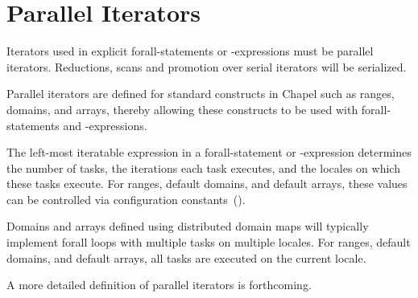 \section{Parallel Iterators}
\label{Parallel_Iterators}

Iterators used in explicit forall-statements or -expressions must be
parallel iterators.  Reductions, scans and promotion over serial
iterators will be serialized.

Parallel iterators are defined for standard constructs in Chapel such
as ranges, domains, and arrays, thereby allowing these constructs to
be used with forall-statements and -expressions.

The left-most iteratable expression in a forall-statement or
-expression determines the number of tasks, the iterations each task
executes, and the locales on which these tasks execute.  For ranges,
default domains, and default arrays, these values can be controlled
via configuration constants~().

Domains and arrays defined using distributed domain maps will
typically implement forall loops with multiple tasks on multiple
locales.  For ranges, default domains, and default arrays, all tasks
are executed on the current locale.

A more detailed definition of parallel iterators is forthcoming.
